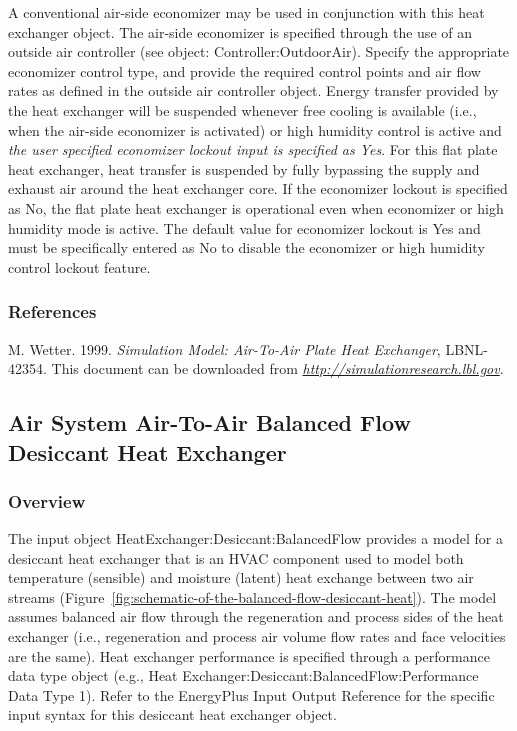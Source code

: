 A conventional air-side economizer may be used in conjunction with this heat exchanger object. The air-side economizer is specified through the use of an outside air controller (see object: Controller:OutdoorAir). Specify the appropriate economizer control type, and provide the required control points and air flow rates as defined in the outside air controller object. Energy transfer provided by the heat exchanger will be suspended whenever free cooling is available (i.e., when the air-side economizer is activated) or high humidity control is active and \emph{the user specified economizer lockout input is specified as Yes}. For this flat plate heat exchanger, heat transfer is suspended by fully bypassing the supply and exhaust air around the heat exchanger core. If the economizer lockout is specified as No, the flat plate heat exchanger is operational even when economizer or high humidity mode is active. The default value for economizer lockout is Yes and must be specifically entered as No to disable the economizer or high humidity control lockout feature.

\subsubsection{References}\label{references-1-010}

M. Wetter. 1999. \emph{Simulation Model: Air-To-Air Plate Heat Exchanger}, LBNL-42354. This document can be downloaded from \href{http://simulationresearch.lbl.gov}{\emph{http://simulationresearch.lbl.gov}}.

\subsection{Air System Air-To-Air Balanced Flow Desiccant Heat Exchanger}\label{air-system-air-to-air-balanced-flow-desiccant-heat-exchanger}

\subsubsection{Overview}\label{overview-2-006}

The input object HeatExchanger:Desiccant:BalancedFlow provides a model for a desiccant heat exchanger that is an HVAC component used to model both temperature (sensible) and moisture (latent) heat exchange between two air streams (Figure~\ref{fig:schematic-of-the-balanced-flow-desiccant-heat}). The model assumes balanced air flow through the regeneration and process sides of the heat exchanger (i.e., regeneration and process air volume flow rates and face velocities are the same). Heat exchanger performance is specified through a performance data type object (e.g., Heat Exchanger:Desiccant:BalancedFlow:Performance Data Type 1). Refer to the EnergyPlus Input Output Reference for the specific input syntax for this desiccant heat exchanger object.

